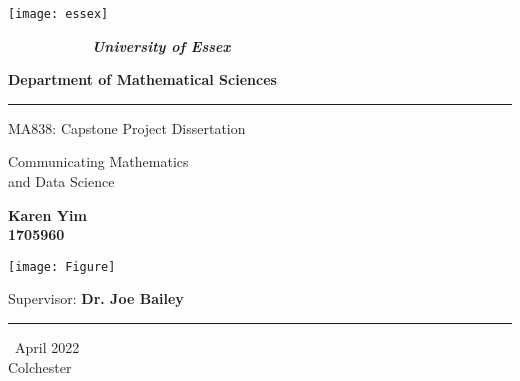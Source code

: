\documentclass[12pt, a4paper,oneside]{book}
\numberwithin{equation}{section}
\begin{document}
\thispagestyle{empty}

\begin{minipage}{0.2\textwidth}
\centerline{\texttt{[image: essex]} }
\end{minipage}
\begin{minipage}{0.8\textwidth}

$ \qquad \qquad \qquad ${\LARGE \bf \sl University of Essex}

{\LARGE \bf Department of Mathematical Sciences}

\end{minipage}

\begin{center}

\noindent\textcolor{myred}{\rule{\linewidth}{4.8pt}}

\vspace{1cm}

{\LARGE \sc  MA838: Capstone Project Dissertation}

\vspace{1.5cm}

{\Huge{\color{myblue}  Communicating Mathematics \\ and Data Science}}

\vspace{1.5cm}

{\Large \bf Karen Yim \\ 1705960}

\vspace{1.5cm}

\centerline{\texttt{[image: Figure]}}

\vspace{1.5cm}

{\Large {Supervisor:} {\color{mygreen} \bf Dr. Joe Bailey}}

\vspace{.25cm}

\noindent\textcolor{myred}{\rule{\linewidth}{4.8pt}}

\vspace{1cm}
{\Large \ April 2022 }\\[4pt]
{\Large Colchester}
\end{center}
\newpage
\tableofcontents

\listoffigures
\listoftables

\end{document}
